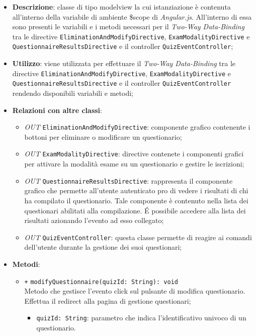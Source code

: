 \begin{itemize}
	\item \textbf{Descrizione}: classe di tipo modelview la cui istanziazione è contenuta all'interno della variabile di ambiente \$scope di \textit{Angular.js}. All'interno di essa sono presenti le variabili e i metodi necessari per il \textit{Two-Way Data-Binding} tra le directive \texttt{EliminationAndModifyDirective}, \texttt{ExamModalityDirective} e \texttt{QuestionnaireResultsDirective} e il controller \texttt{QuizEventController};
	\item \textbf{Utilizzo}: viene utilizzata per effettuare il \textit{Two-Way Data-Binding} tra le directive \texttt{EliminationAndModifyDirective}, \texttt{ExamModalityDirective} e \texttt{QuestionnaireResultsDirective} e il controller \texttt{QuizEventController} rendendo disponibili variabili e metodi;
	\item \textbf{Relazioni con altre classi}: 
	\begin{itemize}
		\item \textit{OUT} \texttt{EliminationAndModifyDirective}: componente grafico contenente i bottoni per eliminare o modificare un questionario;
		\item \textit{OUT} \texttt{ExamModalityDirective}: directive contenete i componenti grafici per attivare la modalità esame su un questionario e gestire le iscrizioni; 
		\item \textit{OUT} \texttt{QuestionnaireResultsDirective}: rappresenta il componente grafico che permette all'utente autenticato pro di vedere i risultati di chi ha compilato il questionario. Tale componente è contenuto nella lista dei questionari abilitati alla compilazione. \'E possibile accedere alla lista dei risultati azionando l'evento ad esso collegato; 
		\item \textit{OUT} \texttt{QuizEventController}: questa classe permette di reagire ai comandi dell'utente durante la gestione dei suoi questionari;
	\end{itemize}
	\item \textbf{Metodi}: 
	\begin{itemize}
		\item \texttt{+} \texttt{modifyQuestionnaire(quizId: String): void} \\
		Metodo che gestisce l’evento click sul pulsante di modifica questionario. Effettua il redirect alla pagina di gestione questionari;
		\begin{itemize}
			\item \texttt{quizId: String}: parametro che indica l'identificativo univoco di un questionario.

\end{itemize}
\end{itemize}
\end{itemize}
